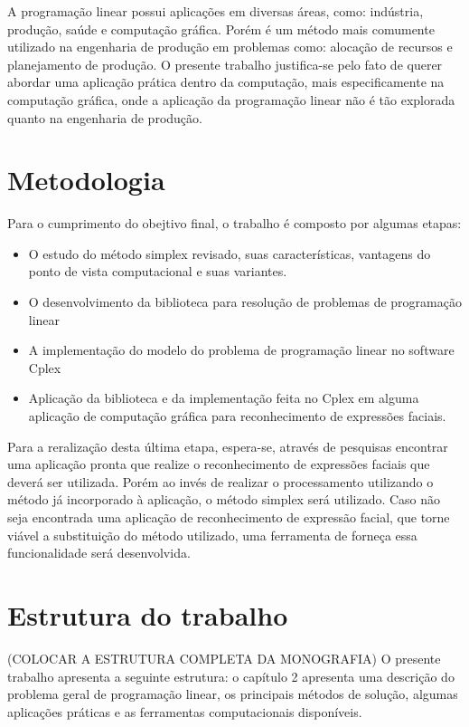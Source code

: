 A programação linear possui aplicações em diversas áreas, como: indústria, produção, saúde e computação gráfica. Porém é um método mais comumente utilizado na engenharia de produção em problemas como: alocação de recursos e planejamento de produção. O presente trabalho justifica-se pelo fato de querer abordar uma aplicação prática dentro da computação, mais especificamente na computação gráfica, onde a aplicação da programação linear não é tão explorada quanto na engenharia de produção.

\section{Metodologia}
Para o cumprimento do obejtivo final, o trabalho é composto por algumas etapas:

\begin{itemize} 
\item O estudo do método simplex revisado, suas características, vantagens do ponto de vista computacional e suas variantes.
\item O desenvolvimento da biblioteca para resolução de problemas de programação linear
\item A implementação do modelo do problema de programação linear no software Cplex
\item Aplicação da biblioteca e da implementação feita no Cplex em alguma aplicação de computação gráfica para reconhecimento de expressões faciais.
\end{itemize}

Para a reralização desta última etapa, espera-se, através de pesquisas encontrar uma aplicação pronta que realize o reconhecimento de expressões faciais que deverá ser utilizada. Porém ao invés de realizar o processamento utilizando o método já incorporado à aplicação, o método simplex será utilizado. Caso não seja encontrada uma aplicação de reconhecimento de expressão facial, que torne viável a substituição do método utilizado, uma ferramenta de forneça essa funcionalidade será desenvolvida.

\section{Estrutura do trabalho} (COLOCAR A ESTRUTURA COMPLETA DA  MONOGRAFIA)
O presente trabalho apresenta a seguinte estrutura: o capítulo 2 apresenta uma descrição do problema geral de programação linear, os principais métodos de solução, algumas aplicações práticas e as ferramentas computacionais disponíveis. 
